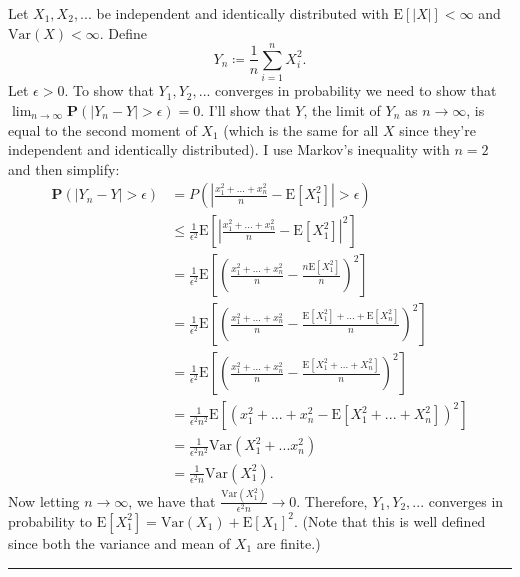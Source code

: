 \documentclass{article}
\theoremstyle{break}
\renewenvironment{proof}{{\bf Proof:}}{\hfill\rule{2mm}{2mm}}
\newcommand{\E}{\mathrm{E}}
\newcommand{\var}{\mathrm{Var}}
\renewcommand{\P}{\mathbf{P}}
\begin{document}
\begin{proof}
  Let $X_1, X_2, ...$ be independent and identically distributed with $\E[|X|] < \infty$ and $\var(X) < \infty$. Define
  \[
    Y_n \coloneqq \frac{1}{n} \sum_{i=1}^n X_i^2.
  \]
  Let $\epsilon > 0$. To show that $Y_1, Y_2, ...$ converges in probability we need to show that $\lim_{n \rightarrow \infty} \P(|Y_n - Y| > \epsilon) = 0$. I'll show that $Y$, the limit of $Y_n$ as $n \rightarrow \infty$, is equal to the second moment of $X_1$ (which is the same for all $X$ since they're independent and identically distributed). I use Markov's inequality with $n = 2$ and then simplify:
  \begin{align*}
    \P(|Y_n - Y| > \epsilon) &= P\left( \left| \frac{x_1^2 + ... + x_n^2}{n} - \E[X_1^2] \right| > \epsilon \right) \\
    &\leq \frac{1}{\epsilon^2} \E\left[ \left| \frac{x_1^2 + ... + x_n^2}{n} - \E[X_1^2] \right|^2 \right] \\
    &= \frac{1}{\epsilon^2} \E\left[ \left( \frac{x_1^2 + ... + x_n^2}{n} - \frac{n\E[X_1^2]}{n} \right)^2 \right] \\
    &= \frac{1}{\epsilon^2} \E\left[ \left( \frac{x_1^2 + ... + x_n^2}{n} - \frac{\E[X_1^2] + ... + \E[X_n^2]}{n} \right)^2 \right] \\
    &= \frac{1}{\epsilon^2} \E\left[ \left( \frac{x_1^2 + ... + x_n^2}{n} - \frac{\E[X_1^2 + ... + X_n^2]}{n} \right)^2 \right] \\
    &= \frac{1}{\epsilon^2 n^2} \E\left[ \left( x_1^2 + ... + x_n^2 - \E[X_1^2 + ... + X_n^2] \right)^2 \right] \\
    &= \frac{1}{\epsilon^2 n^2} \var(X_1^2 + ... x_n^2) \\
    &= \frac{1}{\epsilon^2 n} \var(X_1^2).
  \end{align*}
  Now letting $n \rightarrow \infty$, we have that $\frac{\var(X_1^2)}{\epsilon^2 n} \rightarrow 0$. Therefore, $Y_1, Y_2, ...$ converges in probability to $\E[X_1^2] = \var(X_1) + \E[X_1]^2$. (Note that this is well defined since both the variance and mean of $X_1$ are finite.)
\end{proof}
\end{document}

